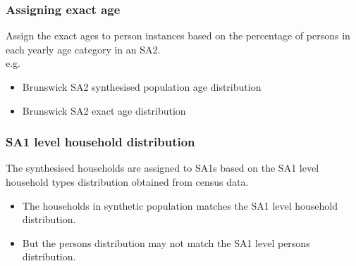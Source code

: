 \begin{frame}%
	\frametitle{Assigning exact age}%
	
	Assign the exact ages to person instances based on the percentage of 
	persons in each yearly age category in an SA2.\\%
	
	e.g.\\
	
	\begin{itemize}%
		\setlength\itemsep{1em}%
			
		\item Brunswick SA2 synthesised population age distribution\\[2pt]%
		
	
		\item Brunswick SA2 exact age distribution\\[2pt]%
		
	\end{itemize}%
\end{frame}%


\begin{frame}%
	\frametitle{SA1 level household distribution}%
	
	The synthesised households are assigned to SA1s based on the SA1 
	level household types distribution obtained from census data.\\[2pt]%
	\begin{itemize}%
		\setlength\itemsep{1em}%
		\item The households  in synthetic population matches the SA1 level 
		household distribution. %
		\item But the persons distribution may not match the SA1 level 
		persons 
		distribution.%
	\end{itemize}%
\end{frame}%



